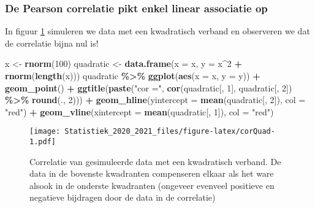 \documentclass[
  12pt,dutch,coursenotes]{book}
\newenvironment{Shaded}{\begin{snugshade}}{\end{snugshade}}
\newcommand{\DataTypeTok}[1]{\textcolor[rgb]{0.13,0.29,0.53}{#1}}
\newcommand{\DecValTok}[1]{\textcolor[rgb]{0.00,0.00,0.81}{#1}}
\newcommand{\KeywordTok}[1]{\textcolor[rgb]{0.13,0.29,0.53}{\textbf{#1}}}
\newcommand{\NormalTok}[1]{#1}
\newcommand{\OperatorTok}[1]{\textcolor[rgb]{0.81,0.36,0.00}{\textbf{#1}}}
\newcommand{\StringTok}[1]{\textcolor[rgb]{0.31,0.60,0.02}{#1}}
\theoremstyle{definition}
\theoremstyle{definition}
\theoremstyle{definition}
\theoremstyle{remark}
\begin{document}
\hypertarget{de-pearson-correlatie-pikt-enkel-linear-associatie-op}{%
\subsubsection{De Pearson correlatie pikt enkel linear associatie op}\label{de-pearson-correlatie-pikt-enkel-linear-associatie-op}}

In figuur \ref{fig:corQuad} simuleren we data met een kwadratisch verband en observeren we dat de correlatie bijna nul is!

\begin{Shaded}
\begin{Highlighting}[]
\NormalTok{x \textless{}{-}}\StringTok{ }\KeywordTok{rnorm}\NormalTok{(}\DecValTok{100}\NormalTok{)}
\NormalTok{quadratic \textless{}{-}}\StringTok{ }\KeywordTok{data.frame}\NormalTok{(}\DataTypeTok{x =}\NormalTok{ x, }\DataTypeTok{y =}\NormalTok{ x}\OperatorTok{\^{}}\DecValTok{2} \OperatorTok{+}\StringTok{ }\KeywordTok{rnorm}\NormalTok{(}\KeywordTok{length}\NormalTok{(x)))}
\NormalTok{quadratic }\OperatorTok{\%\textgreater{}\%}\StringTok{ }\KeywordTok{ggplot}\NormalTok{(}\KeywordTok{aes}\NormalTok{(}\DataTypeTok{x =}\NormalTok{ x, }\DataTypeTok{y =}\NormalTok{ y)) }\OperatorTok{+}\StringTok{ }\KeywordTok{geom\_point}\NormalTok{() }\OperatorTok{+}\StringTok{ }
\StringTok{    }\KeywordTok{ggtitle}\NormalTok{(}\KeywordTok{paste}\NormalTok{(}\StringTok{"cor ="}\NormalTok{, }\KeywordTok{cor}\NormalTok{(quadratic[, }\DecValTok{1}\NormalTok{], quadratic[, }
        \DecValTok{2}\NormalTok{]) }\OperatorTok{\%\textgreater{}\%}\StringTok{ }\KeywordTok{round}\NormalTok{(., }\DecValTok{2}\NormalTok{))) }\OperatorTok{+}\StringTok{ }\KeywordTok{geom\_hline}\NormalTok{(}\DataTypeTok{yintercept =} \KeywordTok{mean}\NormalTok{(quadratic[, }
    \DecValTok{2}\NormalTok{]), }\DataTypeTok{col =} \StringTok{"red"}\NormalTok{) }\OperatorTok{+}\StringTok{ }\KeywordTok{geom\_vline}\NormalTok{(}\DataTypeTok{xintercept =} \KeywordTok{mean}\NormalTok{(quadratic[, }
    \DecValTok{1}\NormalTok{]), }\DataTypeTok{col =} \StringTok{"red"}\NormalTok{)}
\end{Highlighting}
\end{Shaded}

\begin{figure}
\centering
\texttt{[image: Statistiek\_2020\_2021\_files/figure-latex/corQuad-1.pdf]}
\caption{\label{fig:corQuad}Correlatie van gesimuleerde data met een kwadratisch verband. De data in de bovenste kwadranten compenseren elkaar als het ware alsook in de onderste kwadranten (ongeveer evenveel positieve en negatieve bijdragen door de data in de correlatie)}
\end{figure}
\end{document}
